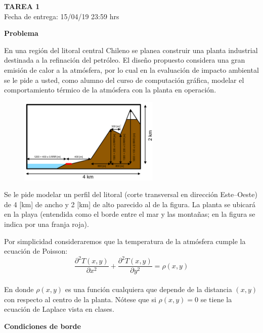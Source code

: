 \documentclass[letterpaper, 11pt]{article}
\newcommand{\newtitle}[1]{\noindent\Large{\textbf{#1}}\\\vspace*{-0.5em}\normalsize}
\newcommand{\tareanro}{1}
\newcommand{\fechaentrega}{15/04/19 23:59 hrs}
\begin{document}
\thispagestyle{firstpage}

\begin{center}
  {\uppercase{\LARGE \bf Tarea \tareanro}}\\
  Fecha de entrega: \fechaentrega
\end{center}


\newtitle{Problema}

En una región del litoral central Chileno se planea construir una planta
industrial destinada a la refinación del petróleo. El diseño propuesto
considera una gran emisión de calor a la atmósfera, por lo cual en la
evaluación de impacto ambiental se le pide a usted, como alumno del curso de computación gráfica, modelar el comportamiento térmico de la atmósfera con la planta en operación. \\

\begin{figure}
\includegraphics[width=0.6\textwidth]{perfil.pdf}
\end{figure}

\par Se le pide modelar un perfil del litoral (corte transversal en dirección
Este--Oeste) de 4 [km] de ancho y 2 [km] de alto parecido al de la figura. La
planta se ubicará en la playa (entendida como el borde entre el mar y las
montañas; en la figura se indica por una franja roja).

Por simplicidad consideraremos que la temperatura de la atmósfera cumple la
ecuación de Poisson:
$$
\frac{\partial^2 T(x, y)}{\partial x^2} +
\frac{\partial^2 T(x, y)}{\partial y^2} = \rho(x,y)
$$
\\
En donde $\rho(x,y)$ es una función cualquiera que depende de la distancia $(x,y)$ con respecto al centro de la planta. Nótese que si $\rho(x,y)=0$ se tiene la ecuación de Laplace vista en clases.

\vspace{0.5cm}
\newtitle{Condiciones de borde}
\end{document}
